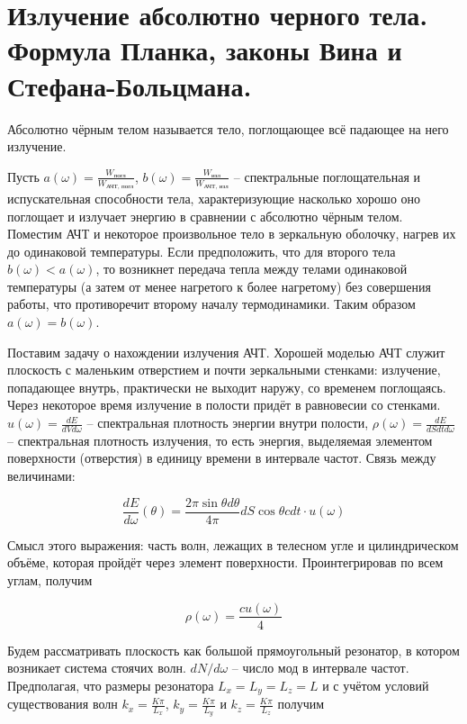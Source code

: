 \section{Излучение абсолютно черного тела. Формула Планка, законы Вина и Стефана-Больцмана.}

\begin{definition}
    Абсолютно чёрным телом называется тело, поглощающее всё падающее на него излучение.
\end{definition}

Пусть $a(\omega) = \frac{W_\text{погл}}{W_\text{АЧТ, погл}}$, $b(\omega) = \frac{W_\text{изл}}{W_\text{АЧТ, изл}}$ -- спектральные поглощательная и испускательная способности тела, характеризующие насколько хорошо оно поглощает и излучает энергию в сравнении с абсолютно чёрным телом. Поместим АЧТ и некоторое произвольное тело в зеркальную оболочку, нагрев их до одинаковой температуры. Если предположить, что для второго тела $b(\omega) < a (\omega)$, то возникнет передача тепла между телами одинаковой температуры (а затем от менее нагретого к более нагретому) без совершения работы, что противоречит второму началу термодинамики. Таким образом $a(\omega) = b(\omega)$.

Поставим задачу о нахождении излучения АЧТ. Хорошей моделью АЧТ служит плоскость с маленьким отверстием и почти зеркальными стенками: излучение, попадающее внутрь, практически не выходит наружу, со временем поглощаясь. Через некоторое время излучение в полости придёт в равновесии со стенками. $u(\omega) = \frac{d E}{d V d \omega}$ -- спектральная плотность энергии внутри полости, $\rho (\omega) = \frac{d E}{d S d t d \omega}$ -- спектральная плотность излучения, то есть энергия, выделяемая элементом поверхности (отверстия) в единицу времени в интервале частот. Связь между величинами:

\begin{equation}
    \frac{d E}{d \omega} (\theta) = \frac{2 \pi \sin \theta d \theta}{4 \pi} d S \cos \theta c dt \cdot u (\omega)
\end{equation}

\noindent
Смысл этого выражения: часть волн, лежащих в телесном угле и цилиндрическом объёме, которая пройдёт через элемент поверхности. Проинтегрировав по всем углам, получим

\begin{equation}
    \rho (\omega) = \frac{c u (\omega)}{4}
\end{equation}

Будем рассматривать плоскость как большой прямоугольный резонатор, в котором возникает система стоячих волн. $d N / d \omega$ -- число мод в интервале частот. Предполагая, что размеры резонатора $L_x = L_y = L_z = L$ и с учётом условий существования волн $k_x = \frac{K \pi}{L_x}$, $k_y = \frac{K \pi}{L_y}$ и $k_z = \frac{K \pi}{L_z}$ получим

